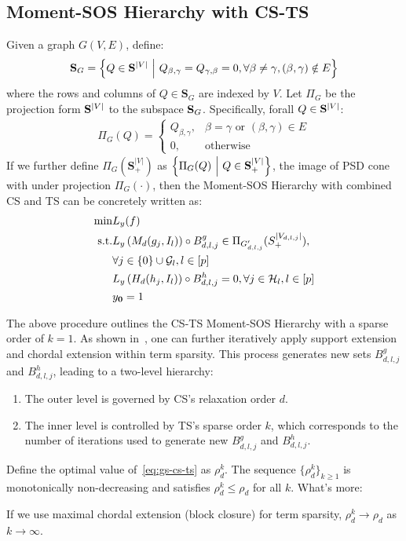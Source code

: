 
\subsection{Moment-SOS Hierarchy with CS-TS}
\label{app:sec:cs-ts-relax}

Given a graph $G(V, E)$, define:
\begin{align}
\mathbf{S}_G = \left\{Q\in \mathbf{S}^{|V|}\ \middle\vert\  Q_{\beta,\gamma} = Q_{\gamma,\beta} = 0, \forall \beta\ne\gamma, (\beta, \gamma)\notin E\right\}
\end{align}
where the rows and columns of $Q \in \mathbf{S}_G$ are indexed by $V$. Let $\Pi_G$ be the projection form $\mathbf{S}^{|V|}$ to the subspace $\mathbf{S}_G$. Specifically, forall $Q\in \mathbf{S}^{|V|}$:
\begin{align}
	\Pi_G(Q) = \begin{cases}
		Q_{\beta,\gamma}, & \beta = \gamma \text{ or } (\beta, \gamma)\in E\\
		0, & \text{otherwise}
	\end{cases}
\end{align}
If we further define $\Pi_G(\mathbf{S}^{|V|}_+)$ as $\left\{\Pi_G(Q) \ \middle\vert\  Q \in \mathbf{S}^{|V|}_+\right\}$, the image of PSD cone with under projection $\Pi_G(\cdot)$, then the Moment-SOS Hierarchy with combined CS and TS can be concretely written as:
\begin{eqnarray}
    \label{eq:gs-cs-ts}
    \min & L_y(f) \\
    \text{s.t.} & L_y\left( M_d(g_j, I_l) \right) \circ B_{d,l,j}^g \in \Pi_{G'_{d,l,j}}(S^{|V_{d,l,j}|}_{+}), \nonumber \\
    & \forall j\in \left\{0\right\} \cup {\cal G}_l, l\in [p] \\
    & L_y\left( H_d(h_j, I_l) \right) \circ B_{d,l,j}^h = 0, \forall j\in {\cal H}_l, l\in [p] \\
    & y_{\mathbf{0}} = 1 
\end{eqnarray} 

The above procedure outlines the CS-TS Moment-SOS Hierarchy with a sparse order of $k = 1$. As shown in~\cite{wang2022tms-cs-tssos}, one can further iteratively apply support extension and chordal extension within term sparsity. This process generates new sets $B_{d,l,j}^g$ and $B_{d,l,j}^h$, leading to a two-level hierarchy:  
\begin{enumerate}
    \item The outer level is governed by CS's relaxation order $d$.  
    \item The inner level is controlled by TS's sparse order $k$, which corresponds to the number of iterations used to generate new $B_{d,l,j}^g$ and $B_{d,l,j}^h$.  
\end{enumerate}
Define the optimal value of~\eqref{eq:gs-cs-ts} as $\rho_d^k$. The sequence $\{\rho_d^k\}_{k \geq 1}$ is monotonically non-decreasing and satisfies $\rho_d^k \leq \rho_d$ for all $k$. What's more:

\begin{theorem}
    If we use maximal chordal extension (\ie block closure) for term sparsity, $\rho_d^k \rightarrow \rho_d$ as $k \rightarrow \infty$.
\end{theorem}